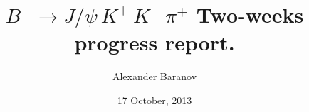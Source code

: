 \documentclass{beamer}
\title[ $B^+ \to J/\psi \, K^+ \, K^- \, \pi^+$ ]{ $B^+ \to J/\psi \, K^+ \, K^- \, \pi^+$ Two-weeks progress report. } %
\author{Alexander Baranov} %
\institute[SINP MSU] %
{
Lomonosov Moscow State University Skobeltsyn Institute of Nuclear Physics (MSU SINP) \\ %
\medskip
\textit{a.baranov@cern.ch} %
}
\date{17 October, 2013} %
\begin{document}
\begin{frame}
\titlepage %
\end{frame}






\end{document}
